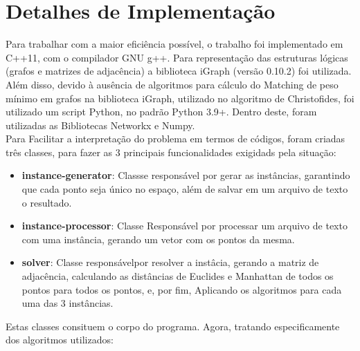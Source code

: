 \documentclass{article}
\begin{document}
\section{Detalhes de Implementação}
Para trabalhar com a maior eficiência possível, o trabalho foi implementado em C++11, com o compilador GNU g++. Para representação das estruturas lógicas (grafos e matrizes de adjacência) a biblioteca iGraph (versão 0.10.2) foi utilizada. Além disso, devido à ausência de algoritmos para cálculo do Matching de peso mínimo em grafos na biblioteca iGraph, utilizado no algoritmo de Christofides, foi utilizado um script Python, no padrão Python 3.9+. Dentro deste, foram utilizadas as Bibliotecas Networkx e Numpy. \\
Para Facilitar a interpretação do problema em termos de códigos, foram criadas três classes, para fazer as 3 principais funcionalidades exigidads pela situação:
\begin{itemize}
    \item \textbf{instance-generator}: Classse responsável por gerar as instâncias, garantindo que cada ponto seja único no espaço, além de salvar em um arquivo de texto o resultado.
    \item \textbf{instance-processor}: Classe Responsável por processar um arquivo de texto com uma instância, gerando um vetor com os pontos da mesma.
    \item \textbf{solver}: Classe responsávelpor resolver a instâcia, gerando a matriz de adjacência, calculando as distâncias de Euclides e Manhattan de todos os pontos para todos os pontos, e, por fim, Aplicando os algoritmos para cada uma das 3 instâncias.
\end{itemize}
Estas classes consituem o corpo do programa. Agora, tratando especificamente dos algoritmos utilizados:
\end{document}
